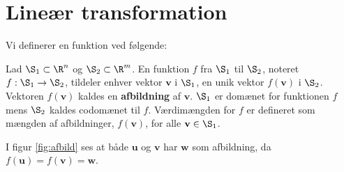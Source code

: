 \section{Lineær transformation}
%
Vi definerer en funktion ved følgende:
%
\begin{defn}{}{}
Lad $\S _1 \subset \R^n$ og $\S _2 \subset \R^m$.
En funktion $f$ fra $\S_1$ til $\S_2$, noteret $f:\S_1\rightarrow\S_2$, tildeler enhver vektor $\textbf{v}$ i $\S_1$, en unik vektor $f(\textbf{v})$ i $\S_2$.
Vektoren $f(\textbf{v})$ kaldes en \textbf{afbildning} af $\textbf{v}$.
$\S_1$ er domænet for funktionen $f$ mens $\S_2$ kaldes codomænet til $f$.
Værdimængden for $f$ er defineret som mængden af afbildninger, $f(\textbf{v})$, for alle $\textbf{v}\in \S_1$.
\end{defn}
%
I figur \ref{fig:afbild} ses at både $\textbf{u}$ og $\textbf{v}$ har $\textbf{w}$ som afbildning, da $f(\textbf{u})=f(\textbf{v})=\textbf{w}$.

%
